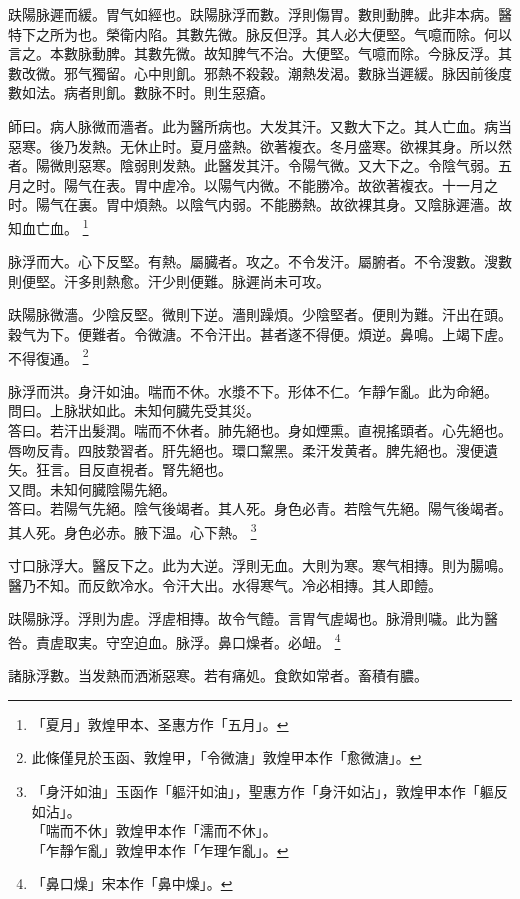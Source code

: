 趺陽脉遲而緩。胃气如經也。趺陽脉浮而數。浮則傷胃。數則動脾。此非本病。醫特下之所为也。榮衛内陷。其數先微。脉反但浮。其人必大便堅。气噫而除。何以言之。本數脉動脾。其數先微。故知脾气不治。大便堅。气噫而除。今脉反浮。其數改微。邪气獨留。心中則飢。邪熱不殺穀。潮熱发渴。數脉当遲緩。脉因前後度數如法。病者則飢。數脉不时。則生惡瘡。

師曰。病人脉微而濇者。此为醫所病也。大发其汗。又數大下之。其人亡血。病当惡寒。後乃发熱。无休止时。夏月盛熱。欲著複衣。冬月盛寒。欲裸其身。所以然者。陽微則惡寒。陰弱則发熱。此醫发其汗。令陽气微。又大下之。令陰气弱。五月之时。陽气在表。胃中虗冷。以陽气内微。不能勝冷。故欲著複衣。十一月之时。陽气在裏。胃中煩熱。以陰气内弱。不能勝熱。故欲裸其身。又陰脉遲濇。故知血亡血。
	\footnote{「夏月」敦煌甲本、圣惠方作「五月」。}

脉浮而大。心下反堅。有熱。屬臓者。攻之。不令发汗。屬腑者。不令溲數。溲數則便堅。汗多則熱愈。汗少則便難。脉遲尚未可攻。

趺陽脉微濇。少陰反堅。微則下逆。濇則躁煩。少陰堅者。便則为難。汗出在頭。穀气为下。便難者。令微溏。不令汗出。甚者遂不得便。煩逆。鼻鳴。上竭下虗。不得復通。
	\footnote{此條僅見於玉函、敦煌甲，「令微溏」敦煌甲本作「愈微溏」。}

脉浮而洪。身汗如油。喘而不休。水漿不下。形体不仁。乍靜乍亂。此为命絕。\\
問曰。上脉狀如此。未知何臓先受其災。\\
答曰。若汗出髮潤。喘而不休者。肺先絕也。身如煙熏。直視搖頭者。心先絕也。唇吻反青。四肢漐習者。肝先絕也。環口黧黑。柔汗发黄者。脾先絕也。溲便遺矢。狂言。目反直視者。腎先絕也。\\
又問。未知何臓陰陽先絕。\\
答曰。若陽气先絕。陰气後竭者。其人死。身色必青。若陰气先絕。陽气後竭者。其人死。身色必赤。腋下温。心下熱。
	\footnote{「身汗如油」玉函作「軀汗如油」，聖惠方作「身汗如沾」，敦煌甲本作「軀反如沾」。\\「喘而不休」敦煌甲本作「濡而不休」。\\「乍靜乍亂」敦煌甲本作「乍理乍亂」。}

寸口脉浮大。醫反下之。此为大逆。浮則无血。大則为寒。寒气相摶。則为腸鳴。醫乃不知。而反飲冷水。令汗大出。水得寒气。冷必相摶。其人即饐。

趺陽脉浮。浮則为虗。浮虗相摶。故令气饐。言胃气虗竭也。脉滑則噦。此为醫咎。責虗取実。守空迫血。脉浮。鼻口燥者。必衄。
	\footnote{「鼻口燥」宋本作「鼻中燥」。}

諸脉浮數。当发熱而洒淅惡寒。若有痛処。食飲如常者。畜積有膿。

